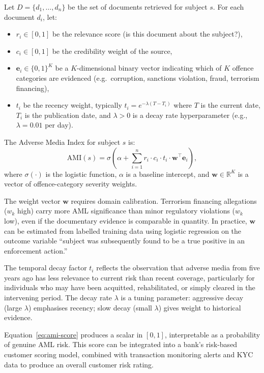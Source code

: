 \begin{definition}
\label{def:adverse-media-index}
Let $D = \{d_1, \ldots, d_n\}$ be the set of documents retrieved for subject $s$. For each document $d_i$, let:
\begin{itemize}
  \item $r_i \in [0,1]$ be the relevance score (is this document about the subject?),
  \item $c_i \in [0,1]$ be the credibility weight of the source,
  \item $\mathbf{e}_i \in \{0,1\}^K$ be a $K$-dimensional binary vector indicating which of $K$ offence categories are evidenced (e.g.\ corruption, sanctions violation, fraud, terrorism financing),
  \item $t_i$ be the recency weight, typically $t_i = e^{-\lambda(T - T_i)}$ where $T$ is the current date, $T_i$ is the publication date, and $\lambda > 0$ is a decay rate hyperparameter (e.g., $\lambda = 0.01$ per day).
\end{itemize}
The Adverse Media Index for subject $s$ is:
\begin{equation}
\label{eq:ami-score}
\mathrm{AMI}(s) = \sigma\!\left(\alpha + \sum_{i=1}^{n} r_i \cdot c_i \cdot t_i \cdot \mathbf{w}^{\top} \mathbf{e}_i\right),
\end{equation}
where $\sigma(\cdot)$ is the logistic function, $\alpha$ is a baseline intercept, and $\mathbf{w} \in \mathbb{R}^K$ is a vector of offence-category severity weights.
\end{definition}

The weight vector $\mathbf{w}$ requires domain calibration. Terrorism financing allegations ($w_k$ high) carry more AML significance than minor regulatory violations ($w_k$ low), even if the documentary evidence is comparable in quantity. In practice, $\mathbf{w}$ can be estimated from labelled training data using logistic regression on the outcome variable ``subject was subsequently found to be a true positive in an enforcement action.''

The temporal decay factor $t_i$ reflects the observation that adverse media from five years ago has less relevance to current risk than recent coverage, particularly for individuals who may have been acquitted, rehabilitated, or simply cleared in the intervening period. The decay rate $\lambda$ is a tuning parameter: aggressive decay (large $\lambda$) emphasises recency; slow decay (small $\lambda$) gives weight to historical evidence.

Equation~\eqref{eq:ami-score} produces a scalar in $[0, 1]$, interpretable as a probability of genuine AML risk. This score can be integrated into a bank's risk-based customer scoring model, combined with transaction monitoring alerts and KYC data to produce an overall customer risk rating.

